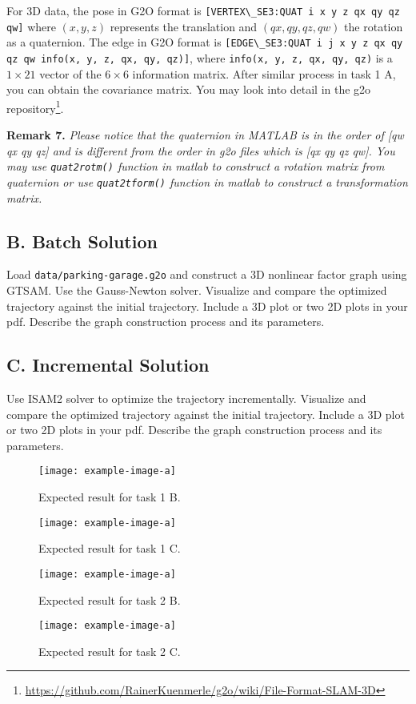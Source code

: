 \documentclass[tp]{lcc}
\begin{document}
For 3D data, the pose in G2O format is \lstinline[style=bash]{[VERTEX\_SE3:QUAT i x y z qx qy qz qw]} where $(x,y,z)$ represents the translation and $(qx,qy,qz,qw)$ the rotation as a quaternion. The edge in G2O format is \lstinline[style=bash]{[EDGE\_SE3:QUAT i j x y z qx qy qz qw info(x, y, z, qx, qy, qz)]}, where \lstinline[style=bash]{info(x, y, z, qx, qy, qz)} is a $1 \times 21$ vector of the $6 \times 6$ information matrix. After similar process in task 1 A, you can obtain the covariance matrix. You may look into detail in the g2o repository\footnote{\url{https://github.com/RainerKuenmerle/g2o/wiki/File-Format-SLAM-3D}}.

\textbf{Remark 7.} \textit{Please notice that the quaternion in MATLAB is in the order of [qw qx qy qz] and is different from the order in g2o files which is [qx qy qz qw]. You may use \lstinline[style=bash]{quat2rotm()} function in matlab to construct a rotation matrix from quaternion or use \lstinline[style=bash]{quat2tform()} function in matlab to construct a transformation matrix.}

\subsection{B. Batch Solution}
Load \lstinline[style=bash]{data/parking-garage.g2o} and construct a 3D nonlinear factor graph using GTSAM. Use the Gauss-Newton solver. Visualize and compare the optimized trajectory against the initial trajectory. Include a 3D plot or two 2D plots in your pdf. Describe the graph construction process and its parameters.

\subsection{C. Incremental Solution}
Use ISAM2 solver to optimize the trajectory incrementally. Visualize and compare the optimized trajectory against the initial trajectory. Include a 3D plot or two 2D plots in your pdf. Describe the graph construction process and its parameters.

\begin{figure}[h]
    \centering
    \texttt{[image: example-image-a]}
    \caption{Expected result for task 1 B.}
    \label{fig:task1b}
\end{figure}

\begin{figure}[h]
    \centering
    \texttt{[image: example-image-a]}
    \caption{Expected result for task 1 C.}
    \label{fig:task1c}
\end{figure}

\begin{figure}[h]
    \centering
    \texttt{[image: example-image-a]}
    \caption{Expected result for task 2 B.}
    \label{fig:task2b}
\end{figure}

\begin{figure}[h]
    \centering
    \texttt{[image: example-image-a]}
    \caption{Expected result for task 2 C.}
    \label{fig:task2c}
\end{figure}
\end{document}
